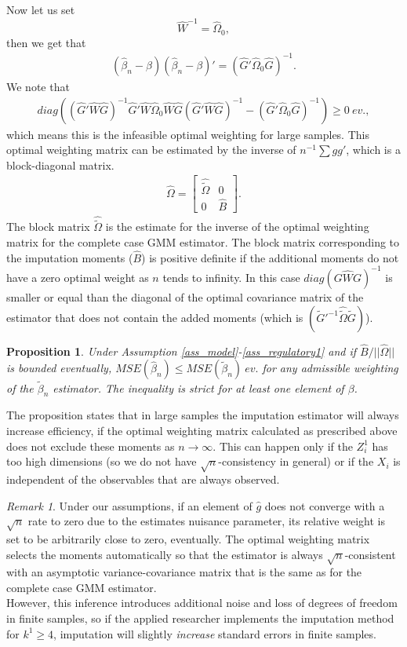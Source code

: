 \documentclass{article}
\newtheorem{proposition}{Proposition}
\theoremstyle{definition}
\theoremstyle{remark}
\newtheorem{remark}{Remark}
\begin{document}
Now let us set
\[\hat{W}^{-1}=\hat{\Omega}_0,
\]
then we get that
\begin{align}
(\hat{\beta}_n -\beta)(\hat{\beta}_n -\beta)'= \left(\hat{G}'\hat{\Omega}_0 \hat{G}\right)^{-1}.
\end{align}
We note that
\begin{align*}
diag\left((\hat{G}'\hat{W}\hat{G})^{-1} \hat{G}'\hat{W} \hat{\Omega}_0 \hat{W} \hat{G} (\hat{G}'\hat{W}\hat{G})^{-1}-  (\hat{G}'\hat{\Omega}_0 \hat{G})^{-1}\right)\geq 0 \ ev.,
\end{align*}
which means this is the infeasible optimal weighting for large samples. This optimal weighting matrix can be estimated by the inverse of $n^{-1}\sum g g'$, which is a block-diagonal matrix.
\begin{align}
\hat{\Omega} = \left[\begin{array}{cc}
\hat{\tilde{\Omega}} & 0 \\ 0 & \hat{B}
\end{array}\right].
\end{align}
The block matrix $\hat{\tilde{\Omega}}$ is the estimate for the inverse of the optimal weighting matrix for the complete case GMM estimator. The block matrix corresponding to the imputation moments ($\hat{B}$) is positive definite if the additional moments do not have a zero optimal weight as $n$ tends to infinity. In this case $diag(G\hat{W}G)^{-1}$ is smaller or equal than the diagonal of the optimal covariance matrix of the estimator that does not contain the added moments (which is $(\tilde{G}'^{-1}\hat{\tilde{\Omega}} \tilde{G})$).
\begin{proposition}
	Under Assumption \ref{ass_model}-\ref{ass_regulatory1} and if $\hat{B}/||\hat{\Omega}||$ is bounded eventually, $MSE(\hat{\beta}_n)\leq MSE(\tilde{\beta}_n) \ ev.$ for any admissible weighting of the $\tilde{\beta}_n$ estimator. The inequality is strict for at least one element of $\beta$.
\end{proposition}
The proposition states that in large samples the imputation estimator will always increase efficiency, if the optimal weighting matrix calculated as prescribed above does not exclude these moments as $n\rightarrow \infty$. This can happen only if the $Z_i^1$ has too high dimensions (so we do not have $\sqrt{n}$-consistency in general) or if the $X_i$ is independent of the observables that are always observed.

\begin{remark}
	Under our assumptions, if an element of $\hat{g}$ does not converge with a $\sqrt{n}$ rate to zero due to the estimates nuisance parameter, its relative weight is set to be arbitrarily close to zero, eventually. The optimal weighting matrix selects the moments automatically so that the estimator is always $\sqrt{n}$-consistent with an asymptotic variance-covariance matrix that is the same as for the complete case GMM estimator.\\
	However, this inference introduces additional noise and loss of degrees of freedom in finite samples, so if the applied researcher implements the imputation method for $k^1\geq 4$, imputation will slightly \textit{increase} standard errors in finite samples. 
\end{remark}
\end{document}
